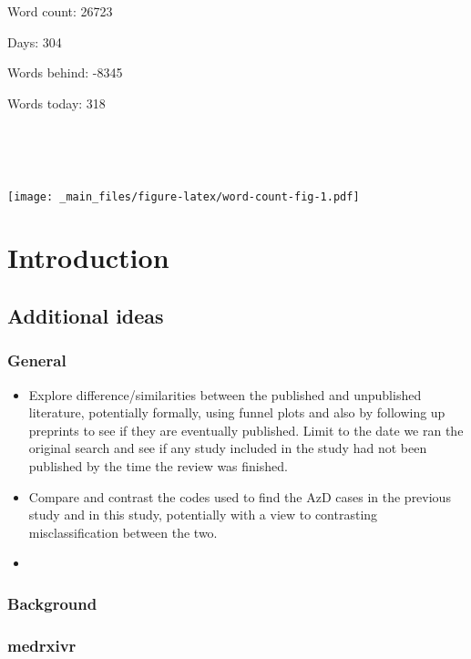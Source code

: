 \documentclass[a4paper, twoside]{templates/ociamthesis}
\begin{document}
\adjustmtc

Word count: 26723

Days: 304

Words behind: -8345

Words today: 318

~

~

\texttt{[image: \_main\_files/figure-latex/word-count-fig-1.pdf]}



\hypertarget{intro-heading}{%
\chapter{Introduction}\label{intro-heading}}

\minitoc 

\hypertarget{additional-ideas}{%
\section{Additional ideas}\label{additional-ideas}}

\hypertarget{general}{%
\subsection{General}\label{general}}

\begin{itemize}
\item
  Explore difference/similarities between the published and unpublished literature, potentially formally, using funnel plots and also by following up preprints to see if they are eventually published. Limit to the date we ran the original search and see if any study included in the study had not been published by the time the review was finished.
\item
  Compare and contrast the codes used to find the AzD cases in the previous study and in this study, potentially with a view to contrasting misclassification between the two.
\item
\end{itemize}

\hypertarget{background}{%
\subsection{Background}\label{background}}

\hypertarget{medrxivr}{%
\subsection{medrxivr}\label{medrxivr}}
\end{document}

